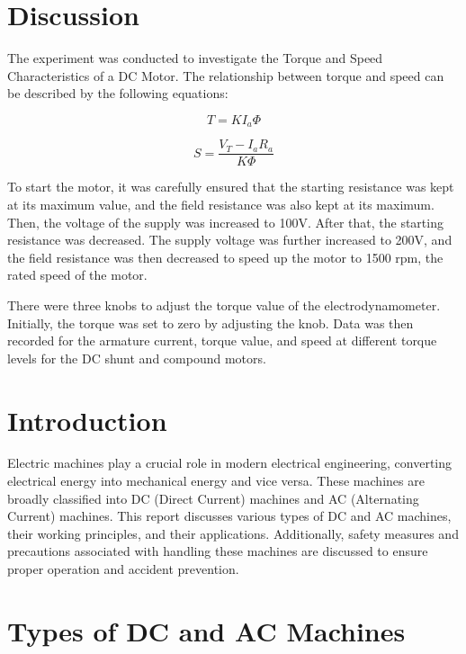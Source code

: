\documentclass[a4paper,12pt]{article}
\begin{document}
	\section{Discussion}
	
	The experiment was conducted to investigate the Torque and Speed Characteristics of a DC Motor. The relationship between torque and speed can be described by the following equations:
	
	\begin{equation}
		T = K I_a \Phi
	\end{equation}
	
	\[
	S = \frac{V_T - I_a R_a}{K \Phi}
	\]
	
	To start the motor, it was carefully ensured that the starting resistance was kept at its maximum value, and the field resistance was also kept at its maximum. Then, the voltage of the supply was increased to 100V. After that, the starting resistance was decreased. The supply voltage was further increased to 200V, and the field resistance was then decreased to speed up the motor to 1500 rpm, the rated speed of the motor.
	
	There were three knobs to adjust the torque value of the electrodynamometer. Initially, the torque was set to zero by adjusting the knob. Data was then recorded for the armature current, torque value, and speed at different torque levels for the DC shunt and compound motors.
	\section{Introduction}
	Electric machines play a crucial role in modern electrical engineering, converting electrical energy into mechanical energy and vice versa. These machines are broadly classified into DC (Direct Current) machines and AC (Alternating Current) machines. This report discusses various types of DC and AC machines, their working principles, and their applications. Additionally, safety measures and precautions associated with handling these machines are discussed to ensure proper operation and accident prevention.
	
	\section{Types of DC and AC Machines}
	
\end{document}
